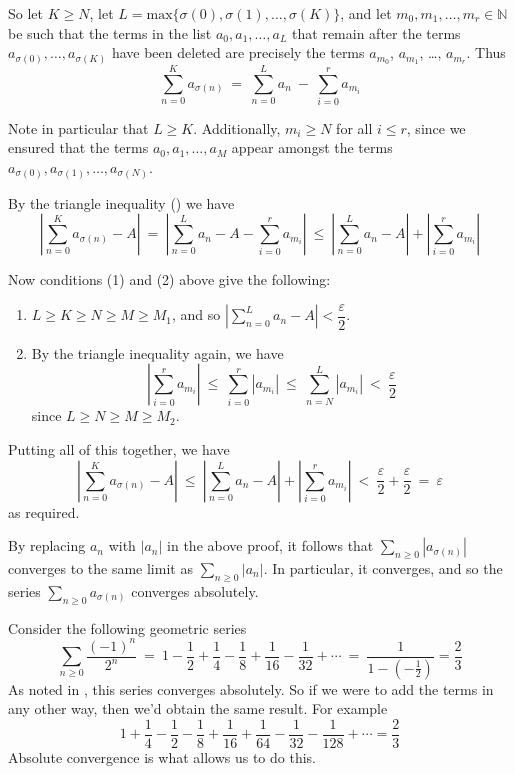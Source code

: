 \begin{cproof}
So let $K \ge N$, let $L = \mathrm{max} \{ \sigma(0), \sigma(1), \dots, \sigma(K) \}$, and let $m_0, m_1, \dots, m_r \in \mathbb{N}$ be such that the terms in the list $a_0, a_1, \dots, a_L$ that remain after the terms $a_{\sigma(0)}, \dots, a_{\sigma(K)}$ have been deleted are precisely the terms $a_{m_0}$, $a_{m_1}$, \dots, $a_{m_r}$. Thus
\[ \sum_{n=0}^K a_{\sigma(n)} ~=~ \sum_{n=0}^L a_n ~-~ \sum_{i=0}^r a_{m_i} \]

Note in particular that $L \ge K$. Additionally, $m_i \ge N$ for all $i \le r$, since we ensured that the terms $a_0, a_1, \dots, a_M$ appear amongst the terms $a_{\sigma(0)}, a_{\sigma(1)}, \dots, a_{\sigma(N)}$.

By the triangle inequality () we have
\[ \left| \sum_{n=0}^K a_{\sigma(n)} - A \right| ~=~ \left| \sum_{n=0}^L a_n - A - \sum_{i=0}^r a_{m_i} \right| ~\le~ \left| \sum_{n=0}^L a_n - A \right| + \left| \sum_{i=0}^r a_{m_i} \right|  \]

Now conditions (1) and (2) above give the following:
\begin{enumerate}[(1)]
\item $L \ge K \ge N \ge M \ge M_1$, and so $\left| \displaystyle \sum_{n=0}^L a_n - A \right| < \dfrac{\varepsilon}{2}$.
\item By the triangle inequality again, we have
\[ \left| \sum_{i=0}^r a_{m_i} \right| ~\le~ \sum_{i=0}^r |a_{m_i}| ~\le~ \sum_{n=N}^L |a_{m_i}| ~<~ \dfrac{\varepsilon}{2} \]
since $L \ge N \ge M \ge M_2$.
\end{enumerate}

Putting all of this together, we have
\[ \left| \sum_{n=0}^K a_{\sigma(n)} - A \right| ~\le~ \left| \sum_{n=0}^L a_n - A \right| + \left| \sum_{i=0}^r a_{m_i} \right| ~<~ \dfrac{\varepsilon}{2} + \dfrac{\varepsilon}{2} ~=~ \varepsilon\] 
as required.

By replacing $a_n$ with $|a_n|$ in the above proof, it follows that $\displaystyle \sum_{n \ge 0} |a_{\sigma(n)}|$ converges to the same limit as $\displaystyle \sum_{n \ge 0} |a_n|$. In particular, it converges, and so the series $\displaystyle \sum_{n \ge 0} a_{\sigma(n)}$ converges absolutely.
\end{cproof}

\begin{example}
Consider the following geometric series
\[ \sum_{n \ge 0} \dfrac{(-1)^n}{2^n} ~=~ 1 - \dfrac{1}{2} + \dfrac{1}{4} - \dfrac{1}{8} + \dfrac{1}{16} - \dfrac{1}{32} + \cdots ~=~ \dfrac{1}{1-(-\frac{1}{2})} = \frac{2}{3} \]
As noted in , this series converges absolutely. So if we were to add the terms in any other way, then we'd obtain the same result. For example
\[ 1 + \frac{1}{4} - \frac{1}{2} - \frac{1}{8} + \frac{1}{16} + \frac{1}{64} - \frac{1}{32} - \dfrac{1}{128} + \cdots = \dfrac{2}{3} \]
Absolute convergence is what allows us to do this.
\end{example}

